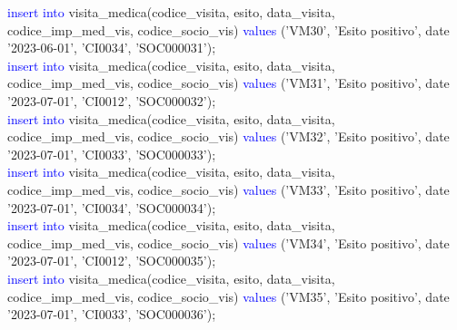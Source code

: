 \documentclass{article}
\begin{document}
\begin{flushleft}
{        \vspace{2mm}
        \hspace*{0.5em}\textcolor{blue}{insert into} visita\_medica(codice\_visita, esito, data\_visita, codice\_imp\_med\_vis, \hspace*{0.5em}codice\_socio\_vis) \textcolor{blue}{values} ('VM30', 'Esito positivo', date '2023-06-01', 'CI0034', \hspace*{0.5em}'SOC000031'); \\
        \vspace{2mm}
        \hspace*{0.5em}\textcolor{blue}{insert into} visita\_medica(codice\_visita, esito, data\_visita, codice\_imp\_med\_vis, \hspace*{0.5em}codice\_socio\_vis) \textcolor{blue}{values} ('VM31', 'Esito positivo', date '2023-07-01', 'CI0012', \hspace*{0.5em}'SOC000032'); \\
        \vspace{2mm}
        \hspace*{0.5em}\textcolor{blue}{insert into} visita\_medica(codice\_visita, esito, data\_visita, codice\_imp\_med\_vis, \hspace*{0.5em}codice\_socio\_vis) \textcolor{blue}{values} ('VM32', 'Esito positivo', date '2023-07-01', 'CI0033', \hspace*{0.5em}'SOC000033'); \\
        \vspace{2mm}
        \hspace*{0.5em}\textcolor{blue}{insert into} visita\_medica(codice\_visita, esito, data\_visita, codice\_imp\_med\_vis, \hspace*{0.5em}codice\_socio\_vis) \textcolor{blue}{values} ('VM33', 'Esito positivo', date '2023-07-01', 'CI0034', \hspace*{0.5em}'SOC000034'); \\
        \vspace{2mm}
        \hspace*{0.5em}\textcolor{blue}{insert into} visita\_medica(codice\_visita, esito, data\_visita, codice\_imp\_med\_vis, \hspace*{0.5em}codice\_socio\_vis) \textcolor{blue}{values} ('VM34', 'Esito positivo', date '2023-07-01', 'CI0012', \hspace*{0.5em}'SOC000035'); \\
        \vspace{2mm}
        \hspace*{0.5em}\textcolor{blue}{insert into} visita\_medica(codice\_visita, esito, data\_visita, codice\_imp\_med\_vis, \hspace*{0.5em}codice\_socio\_vis) \textcolor{blue}{values} ('VM35', 'Esito positivo', date '2023-07-01', 'CI0033', \hspace*{0.5em}'SOC000036'); \\
}
\end{flushleft}
\end{document}
